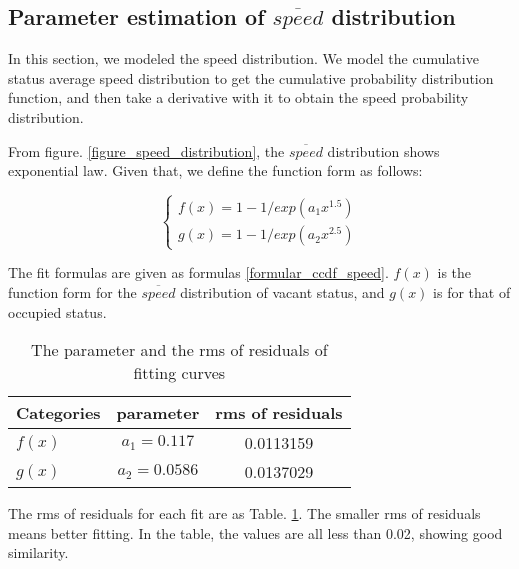 \subsection{Parameter estimation of $\overline{speed}$ distribution}
\label{section_speed_modeling}
In this section, we modeled the speed distribution. We model the cumulative status average speed distribution to get the cumulative probability distribution function, and then take a derivative with it to obtain the speed probability distribution.

From figure. \ref{figure_speed_distribution}, the $\overline{speed}$ distribution shows exponential law. Given that, we define the function form as follows:

\begin{equation}\label{formular_ccdf_speed}
\left\{
\begin{array}{ll}
f(x) = 1-1/exp(a_1x^{1.5})\\
g(x) = 1-1/exp(a_2x^{2.5})
\end{array}
\right.
\end{equation}

The fit formulas are given as formulas \ref{formular_ccdf_speed}. $f(x)$ is the function form for the $\overline{speed}$ distribution of vacant status, and $g(x)$ is for that of occupied status.

\begin{table}[!h]
\caption{The parameter and the rms of residuals of fitting curves}\label{table_rms}
\centering
\begin{tabular}{l|c|c}
  \hline
  Categories & parameter & rms of residuals\\
  \hline
  $f(x)$ &$a_1=0.117$ &0.0113159\\
  $g(x)$ &$a_2=0.0586$ &0.0137029\\
  \hline
\end{tabular}
\end{table}

The rms of residuals for each fit are as Table. \ref{table_rms}. The smaller rms of residuals means better fitting.
In the table, the values are all less than 0.02, showing good similarity.


